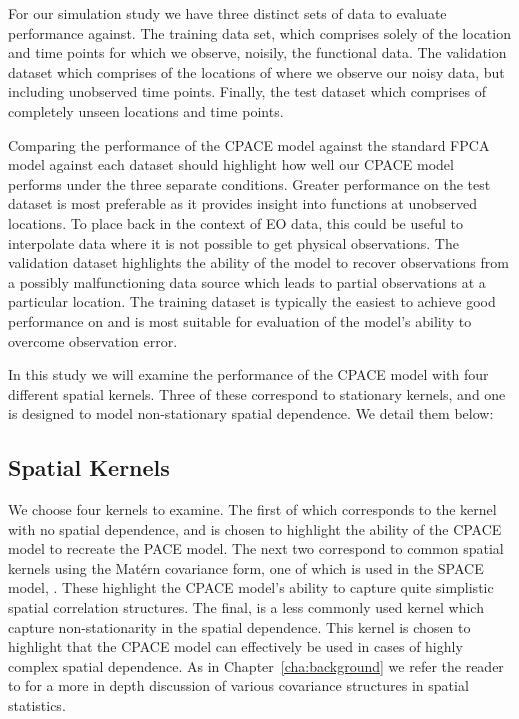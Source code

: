 For our simulation study we have three distinct sets of data to evaluate performance against.
The training data set, which comprises solely of the location and time points for which we observe, noisily, the functional data.
The validation dataset which comprises of the locations of where we observe our noisy data, but including unobserved time points. 
Finally, the test dataset which comprises of completely unseen locations and time points.

Comparing the performance of the CPACE model against the standard FPCA model against each dataset should highlight how well our CPACE model performs under the three separate conditions.
Greater performance on the test dataset is most preferable as it provides insight into functions at unobserved locations.
To place back in the context of EO data, this could be useful to interpolate data where it is not possible to get physical observations.
The validation dataset highlights the ability of the model to recover observations from a possibly malfunctioning data source which leads to partial observations at a particular location.
The training dataset is typically the easiest to achieve good performance on and is most suitable for evaluation of the model's ability to overcome observation error.

In this study we will examine the performance of the CPACE model with four different spatial kernels.
Three of these correspond to stationary kernels, and one is designed to model non-stationary spatial dependence. We detail them below: 

\subsection{Spatial Kernels  \label{ssec:spatial_kern}}
We choose four kernels to examine. The first of which corresponds to the kernel with no spatial dependence, and is chosen to highlight the ability of the CPACE model to recreate the PACE model. 
The next two correspond to common spatial kernels using the Mat\'ern covariance form, one of which is used in the SPACE model, \citep{liu_functional_2017}. These highlight the CPACE model's ability to capture quite simplistic spatial correlation structures.
The final, is a less commonly used kernel which capture non-stationarity in the spatial dependence.
This kernel is chosen to highlight that the CPACE model can effectively be used in cases of highly complex spatial dependence.
As in Chapter~\ref{cha:background} we refer the reader to \cite{cressie_statistics_2011} for a more in depth discussion of various covariance structures in spatial statistics.

